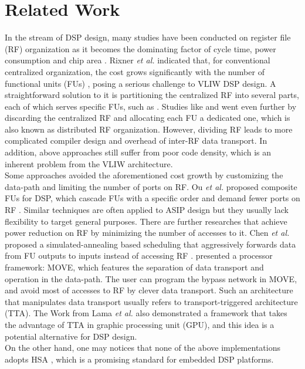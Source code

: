 \chapter{Related Work}
\label{cha:related}
    In the stream of DSP design, many studies have been conducted on register file (RF) organization as it becomes the dominating factor of cycle time, power consumption and chip area \cite{register}.
    Rixner \textit{et al.} indicated that, for conventional centralized organization, the cost grows significantly with the number of functional units (FUs) \cite{register}, posing a serious challenge to VLIW DSP design.
    A straightforward solution to it is partitioning the centralized RF into several parts, each of which serves specific FUs, such as \cite{cluster}.
    Studies like \cite{synzen} and \cite{dsplite} went even further by discarding the centralized RF and allocating each FU a dedicated one, which is also known as distributed RF organization.
    However, dividing RF leads to more complicated compiler design and overhead of inter-RF data transport.
    In addition, above approaches still suffer from poor code density, which is an inherent problem from the VLIW architecture.
    \\\indent
    Some approaches avoided the aforementioned cost growth by customizing the data-path and limiting the number of ports on RF.
    Ou \textit{et al.} proposed composite FUs for DSP, which cascade FUs with a specific order and demand fewer ports on RF \cite{cascade} \cite{hearaid}.
    Similar techniques are often applied to ASIP design but they usually lack flexibility to target general purposes.
    There are further researches that achieve power reduction on RF by minimizing the number of accesses to it.
    Chen \textit{et al.} proposed a simulated-annealing based scheduling that aggressively forwards data from FU outputs to inputs instead of accessing RF \cite{multistage}.
    \cite{move} presented a processor framework: MOVE, which features the separation of data transport and operation in the data-path. 
    The user can program the bypass network in MOVE, and avoid most of accesses to RF by clever data transport.
    Such an architecture that manipulates data transport usually refers to transport-triggered architecture (TTA).
    The Work from Lama \textit{et al.} \cite{ttagpu} also demonstrated a framework that takes the advantage of TTA in graphic processing unit (GPU), and this idea is a potential alternative for DSP design.
    \\\indent
    On the other hand, one may notices that none of the above implementations adopts HSA \cite{systemspec}, which is a promising standard for embedded DSP platforms.
